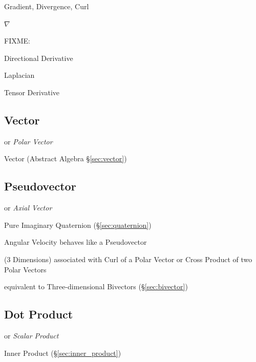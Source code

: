 {Gradient, Divergence, Curl

$\nabla$

FIXME:

Directional Derivative

Laplacian

Tensor Derivative



\subsection{Vector}\label{sec:linear_vector}

or \emph{Polar Vector}

\fist Vector (Abstract Algebra \S\ref{sec:vector})



\subsection{Pseudovector}\label{sec:pseudovector}

or \emph{Axial Vector}

\fist Pure Imaginary Quaternion (\S\ref{sec:quaternion})

Angular Velocity behaves like a Pseudovector

(3 Dimensions) associated with Curl of a Polar Vector or Cross Product of two
Polar Vectors

equivalent to Three-dimensional Bivectors (\S\ref{sec:bivector})



\subsection{Dot Product}\label{sec:dot_product}

or \emph{Scalar Product}

Inner Product (\S\ref{sec:inner_product})



}
